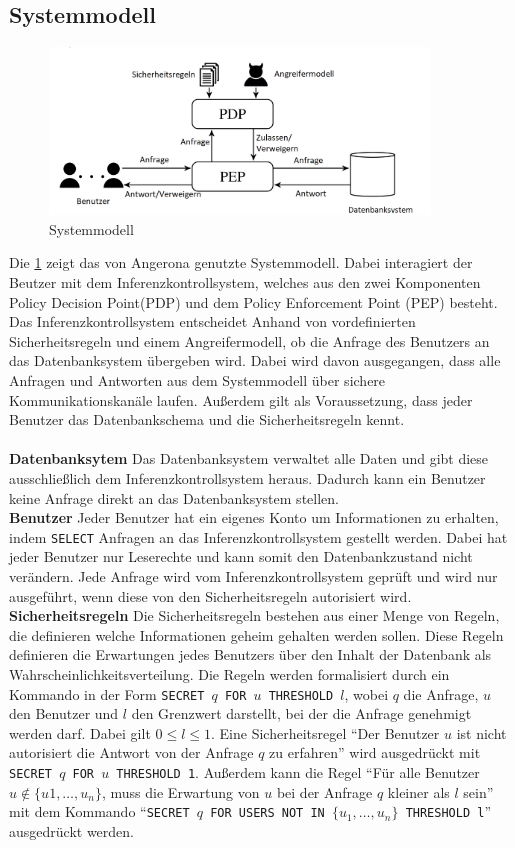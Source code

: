 \documentclass[german,version-2020-11]{uzl-thesis}
\begin{document}
\subsection{Systemmodell}
\begin{figure}[ht]
	\centering
	\includegraphics[width=0.9\textwidth]{System-model.PNG}
	\caption{Systemmodell}
	\label{fig1}
\end{figure}
\noindent 
Die \cref{fig1} zeigt das von Angerona genutzte Systemmodell. Dabei interagiert der Beutzer mit dem Inferenzkontrollsystem, welches aus den zwei Komponenten Policy Decision Point(PDP) und dem Policy Enforcement Point (PEP) besteht. Das Inferenzkontrollsystem entscheidet Anhand von vordefinierten Sicherheitsregeln und einem Angreifermodell, ob die Anfrage des Benutzers an das Datenbanksystem übergeben wird. Dabei wird davon ausgegangen, dass alle Anfragen und Antworten aus dem Systemmodell über sichere Kommunikationskanäle laufen. Außerdem gilt als Voraussetzung, dass jeder Benutzer das Datenbankschema und die Sicherheitsregeln kennt. \\ \\ 
\textbf{Datenbanksytem} Das Datenbanksystem verwaltet alle Daten und gibt diese ausschließlich dem Inferenzkontrollsystem  heraus. Dadurch kann ein Benutzer keine Anfrage direkt an das Datenbanksystem stellen. \\
\textbf{Benutzer} Jeder Benutzer hat ein eigenes Konto um Informationen zu erhalten, indem \texttt{SELECT} Anfragen an das Inferenzkontrollsystem gestellt werden. Dabei hat jeder Benutzer nur Leserechte und kann somit den Datenbankzustand nicht verändern. Jede Anfrage wird vom Inferenzkontrollsystem geprüft und wird nur ausgeführt, wenn diese von den Sicherheitsregeln autorisiert wird. \\ 
\textbf{Sicherheitsregeln} Die Sicherheitsregeln bestehen aus einer Menge von Regeln, die definieren welche Informationen geheim gehalten werden sollen. Diese Regeln definieren die Erwartungen jedes Benutzers über den Inhalt der Datenbank als Wahrscheinlichkeitsverteilung. Die Regeln werden formalisiert durch ein Kommando in der Form \texttt{SECRET $q$ FOR $u$ THRESHOLD $l$}, wobei $q$ die Anfrage, $u$ den Benutzer und $l$ den Grenzwert darstellt, bei der die Anfrage genehmigt werden darf. Dabei gilt $0 \leq l \leq 1$. Eine Sicherheitsregel \enquote{Der Benutzer $u$ ist nicht autorisiert die Antwort von der Anfrage $q$ zu erfahren} wird ausgedrückt mit \texttt{SECRET $q$ FOR $u$ THRESHOLD 1}. Außerdem kann die Regel \enquote{Für alle Benutzer $u \notin \{u1,\dots,u_n\}$, muss die Erwartung von $u$ bei der Anfrage $q$ kleiner als $l$ sein} mit dem Kommando \enquote{\texttt{SECRET $q$ FOR USERS NOT IN $\{u_1,\dots,u_n\}$ THRESHOLD l}} ausgedrückt werden.\\ 
\end{document}
